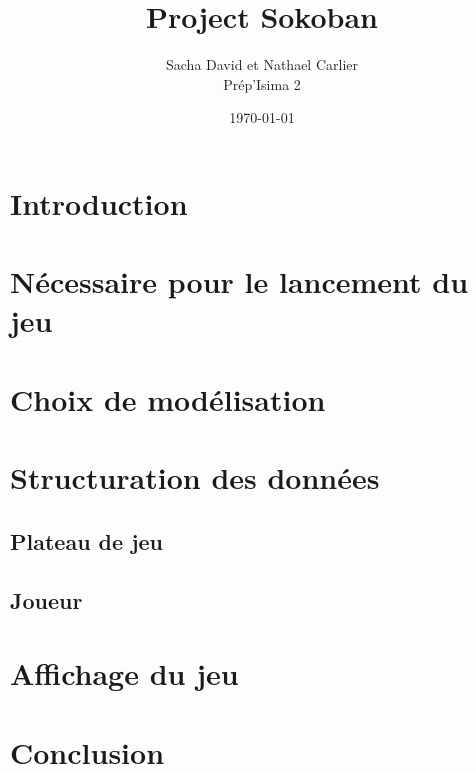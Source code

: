 \documentclass[french, 12pt]{article}
\title{Project Sokoban}
\author{Sacha David et Nathael Carlier\\
        Prép'Isima 2}
\date{\today}
\begin{document}
\maketitle

\tableofcontents

\section{Introduction}

\section{Nécessaire pour le lancement du jeu}

\section{Choix de  modélisation} %

\section{Structuration des données}

    \subsection{Plateau de jeu}

    \subsection{Joueur}


\section{Affichage du jeu}

\section{Conclusion}
\end{document}
